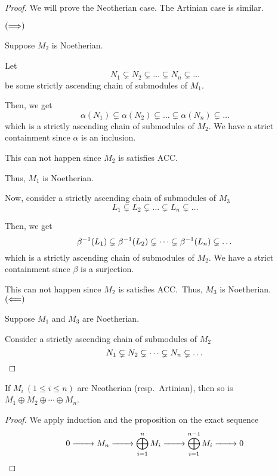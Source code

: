 \begin{proof}
	We will prove the Neotherian case.
	The Artinian case is similar.

	\(\left( \Longrightarrow \right)\)

	Suppose \(M_2\) is Noetherian.

	Let
	\[
		N_1 \subsetneq N_2 \subsetneq \dots \subsetneq N_n \subsetneq \dots
	\]
	be some strictly ascending chain of submodules of \(M_1\).

	Then, we get
	\[
		\alpha(N_1) \subsetneq \alpha(N_2) \subsetneq \dots
		\subsetneq \alpha(N_n) \subsetneq \dots
	\]
	which is a strictly ascending chain of submodules of \(M_2\).
	We have a strict containment since \(\alpha\) is an inclusion.

	This can not happen since \(M_2\) is satisfies ACC.\

	Thus, \(M_1\) is Noetherian.

	Now, consider a strictly ascending chain of submodules of \(M_3\)
	\[
		L_1 \subsetneq L_2 \subsetneq \dots \subsetneq L_n \subsetneq \dots
	\]

	Then, we get
	\[
		\beta^{-1}(L_1) \subsetneq \beta^{-1}(L_2) \subsetneq \dots
		\subsetneq \beta^{-1}(L_n) \subsetneq \dots
	\]
	which is a strictly ascending chain of submodules of \(M_2\).
	We have a strict containment since \(\beta\) is a surjection.

	This can not happen since \(M_2\) is satisfies ACC.\
	Thus, \(M_3\) is Noetherian. \\

	\(\left( \Longleftarrow \right)\)

	Suppose \(M_1\) and \(M_3\) are Noetherian.

	Consider a strictly ascending chain of submodules of \(M_2\)
	\[
		N_1 \subsetneq N_2 \subsetneq \dots \subsetneq N_n \subsetneq \dots
		\qedhere
	\]
\end{proof}


\begin{corollary}{}{}
	If \(M_i \ (1 \leq i \leq n)\) are Neotherian (resp.\ Artinian), then
	so is \(M_1 \oplus M_2 \oplus \cdots \oplus M_n\).
\end{corollary}

\begin{proof}
	We apply induction and the proposition on the exact sequence
	\[
		0 \xrightarrow[\quad\quad]{} M_n \xrightarrow[\quad\quad]{}
		\bigoplus_{i=1}^n M_i \xrightarrow[\quad\quad]{}
		\bigoplus_{i=1}^{n-1} M_i \xrightarrow[\quad\quad]{} 0 \qedhere
	\]
\end{proof}

